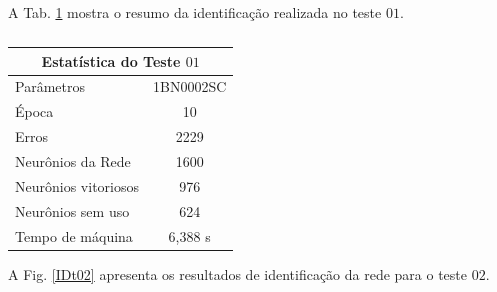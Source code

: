 A Tab. \ref{Estatistica do teste $01$} mostra o resumo da identificação realizada no teste $01$.

\begin{table}[H]
	\centering
	\caption{}
	\label{Estatistica do teste $01$}
	\begin{tabular}{@{}lc@{}}
		\toprule
		\multicolumn{2}{c}{Estatística do Teste $01$}         \\ \midrule
		Parâmetros                  & 1BN0002SC \\
		Época                       & 10       \\
		Erros                       & 2229       \\
		Neurônios da Rede           & 1600       \\
		Neurônios vitoriosos        & 976       \\
		Neurônios sem uso           & 624         \\
		Tempo de máquina            & 6,388 s   \\ \bottomrule
	\end{tabular}
\end{table} 

A Fig. \ref{IDt02} apresenta os resultados de identificação da rede para o teste $02$.

